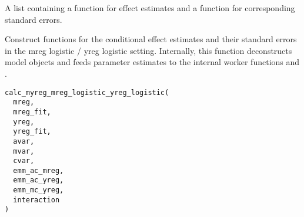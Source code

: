 \documentclass[a4paper]{book}
\begin{document}
%
\begin{Value}
A list containing a function for effect estimates and a function for corresponding standard errors.
\end{Value}
%
\begin{Description}
Construct functions for the conditional effect estimates and their standard errors in the mreg logistic / yreg logistic setting. Internally, this function deconstructs model objects and feeds parameter estimates to the internal worker functions  and .
\end{Description}
%
\begin{Usage}
\begin{verbatim}
calc_myreg_mreg_logistic_yreg_logistic(
  mreg,
  mreg_fit,
  yreg,
  yreg_fit,
  avar,
  mvar,
  cvar,
  emm_ac_mreg,
  emm_ac_yreg,
  emm_mc_yreg,
  interaction
)
\end{verbatim}
\end{Usage}
%
\end{document}
